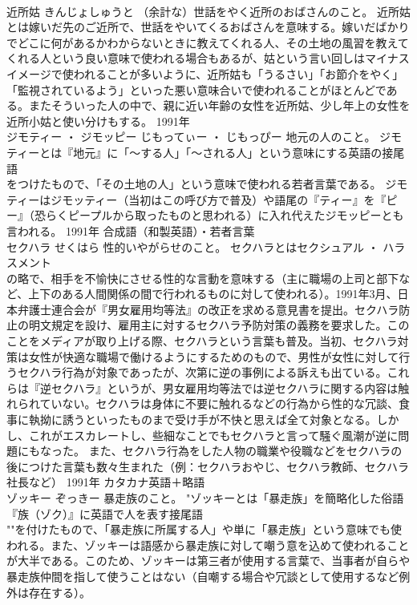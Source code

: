 \documentclass[8pt]{extreport}
\begin{document}
\begin{CJK}{UTF8}{min}
\\	近所姑	きんじょしゅうと	（余計な）世話をやく近所のおばさんのこと。	近所姑とは嫁いだ先のご近所で、世話をやいてくるおばさんを意味する。嫁いだばかりでどこに何があるかわからないときに教えてくれる人、その土地の風習を教えてくれる人という良い意味で使われる場合もあるが、姑という言い回しはマイナスイメージで使われることが多いように、近所姑も「うるさい」「お節介をやく」「監視されているよう」といった悪い意味合いで使われることがほとんどである。またそういった人の中で、親に近い年齢の女性を近所姑、少し年上の女性を近所小姑と使い分けもする。	1991年	
\\	ジモティー ・ ジモッピー	じもってぃー ・ じもっぴー	地元の人のこと。	ジモティーとは『地元』に「～する人」「～される人」という意味にする英語の接尾語
\\	をつけたもので、「その土地の人」という意味で使われる若者言葉である。 ジモティーはジモッティー（当初はこの呼び方で普及）や語尾の『ティー』を『ピー』（恐らくピープルから取ったものと思われる）に入れ代えたジモッピーとも言われる。	1991年	合成語（和製英語）・若者言葉	
\\	セクハラ	せくはら	性的いやがらせのこと。	セクハラとはセクシュアル ・ ハラスメント
\\	の略で、相手を不愉快にさせる性的な言動を意味する（主に職場の上司と部下など、上下のある人間関係の間で行われるものに対して使われる）。1991年3月、日本弁護士連合会が『男女雇用均等法』の改正を求める意見書を提出。セクハラ防止の明文規定を設け、雇用主に対するセクハラ予防対策の義務を要求した。このことをメディアが取り上げる際、セクハラという言葉も普及。当初、セクハラ対策は女性が快適な職場で働けるようにするためのもので、男性が女性に対して行うセクハラ行為が対象であったが、次第に逆の事例による訴えも出ている。これらは『逆セクハラ』というが、男女雇用均等法では逆セクハラに関する内容は触れられていない。セクハラは身体に不要に触れるなどの行為から性的な冗談、食事に執拗に誘うといったものまで受け手が不快と思えば全て対象となる。しかし、これがエスカレートし、些細なことでもセクハラと言って騒ぐ風潮が逆に問題にもなった。 また、セクハラ行為をした人物の職業や役職などをセクハラの後につけた言葉も数々生まれた（例：セクハラおやじ、セクハラ教師、セクハラ社長など）	1991年	カタカナ英語＋略語	
\\	ゾッキー	ぞっきー	暴走族のこと。	"ゾッキーとは「暴走族」を簡略化した俗語『族（ゾク）』に英語で人を表す接尾語
\\	""を付けたもので、「暴走族に所属する人」や単に「暴走族」という意味でも使われる。また、ゾッキーは語感から暴走族に対して嘲う意を込めて使われることが大半である。このため、ゾッキーは第三者が使用する言葉で、当事者が自らや暴走族仲間を指して使うことはない（自嘲する場合や冗談として使用するなど例外は存在する）。

\end{CJK}
\end{document}
